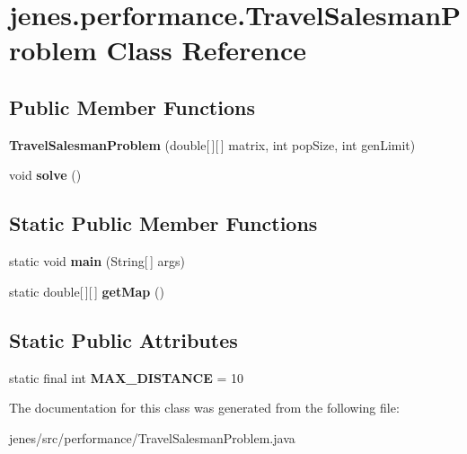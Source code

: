 \hypertarget{classjenes_1_1performance_1_1_travel_salesman_problem}{\section{jenes.\-performance.\-Travel\-Salesman\-Problem Class Reference}
\label{classjenes_1_1performance_1_1_travel_salesman_problem}
}
\subsection*{Public Member Functions}
\begin{DoxyCompactItemize}
\item 
\hypertarget{classjenes_1_1performance_1_1_travel_salesman_problem_a1c5f34122ccb13c01584d05f0c7a1d61}{{\bfseries Travel\-Salesman\-Problem} (double\mbox{[}$\,$\mbox{]}\mbox{[}$\,$\mbox{]} matrix, int pop\-Size, int gen\-Limit)}\label{classjenes_1_1performance_1_1_travel_salesman_problem_a1c5f34122ccb13c01584d05f0c7a1d61}

\item 
\hypertarget{classjenes_1_1performance_1_1_travel_salesman_problem_a2f0d24ae04735fe7926f2b647809692d}{void {\bfseries solve} ()}\label{classjenes_1_1performance_1_1_travel_salesman_problem_a2f0d24ae04735fe7926f2b647809692d}

\end{DoxyCompactItemize}
\subsection*{Static Public Member Functions}
\begin{DoxyCompactItemize}
\item 
\hypertarget{classjenes_1_1performance_1_1_travel_salesman_problem_ab2888d221761235635b6909357f6647c}{static void {\bfseries main} (String\mbox{[}$\,$\mbox{]} args)}\label{classjenes_1_1performance_1_1_travel_salesman_problem_ab2888d221761235635b6909357f6647c}

\item 
\hypertarget{classjenes_1_1performance_1_1_travel_salesman_problem_a0a22dfc28881be8cf6a73e8f90a169e1}{static double\mbox{[}$\,$\mbox{]}\mbox{[}$\,$\mbox{]} {\bfseries get\-Map} ()}\label{classjenes_1_1performance_1_1_travel_salesman_problem_a0a22dfc28881be8cf6a73e8f90a169e1}

\end{DoxyCompactItemize}
\subsection*{Static Public Attributes}
\begin{DoxyCompactItemize}
\item 
\hypertarget{classjenes_1_1performance_1_1_travel_salesman_problem_aceff750d55c6086531bf25b73289ac4e}{static final int {\bfseries M\-A\-X\-\_\-\-D\-I\-S\-T\-A\-N\-C\-E} = 10}\label{classjenes_1_1performance_1_1_travel_salesman_problem_aceff750d55c6086531bf25b73289ac4e}

\end{DoxyCompactItemize}


The documentation for this class was generated from the following file\-:\begin{DoxyCompactItemize}
\item 
jenes/src/performance/Travel\-Salesman\-Problem.\-java\end{DoxyCompactItemize}
